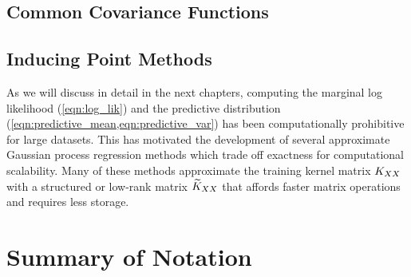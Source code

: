 \subsection{Common Covariance Functions}
\label{sec:common_kernels}

\subsection{Inducing Point Methods}

As we will discuss in detail in the next chapters, computing the marginal log likelihood (\cref{eqn:log_lik}) and the predictive distribution (\cref{eqn:predictive_mean,eqn:predictive_var}) has been computationally prohibitive for large datasets.
This has motivated the development of several approximate Gaussian process regression methods \citep[e.g.][]{quinonero2005unifying,snelson2006sparse,titsias2009variational,hensman2013gaussian,wilson2015kernel,gardner2018product,evans2018scalable} which trade off exactness for computational scalability.
Many of these methods approximate the training kernel matrix $K_{XX}$ with a structured or low-rank matrix $\widetilde{K}_{XX}$ that affords faster matrix operations and requires less storage.

\section{Summary of Notation}


